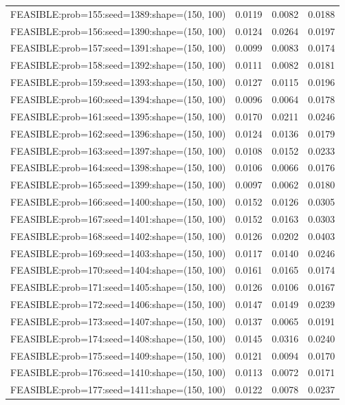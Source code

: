 \begin{longtable}{lccc}
FEASIBLE:prob=155:seed=1389:shape=(150, 100) &   0.0119 & 0.0082 & 0.0188 \\
FEASIBLE:prob=156:seed=1390:shape=(150, 100) &   0.0124 & 0.0264 & 0.0197 \\
FEASIBLE:prob=157:seed=1391:shape=(150, 100) &   0.0099 & 0.0083 & 0.0174 \\
FEASIBLE:prob=158:seed=1392:shape=(150, 100) &   0.0111 & 0.0082 & 0.0181 \\
FEASIBLE:prob=159:seed=1393:shape=(150, 100) &   0.0127 & 0.0115 & 0.0196 \\
FEASIBLE:prob=160:seed=1394:shape=(150, 100) &   0.0096 & 0.0064 & 0.0178 \\
FEASIBLE:prob=161:seed=1395:shape=(150, 100) &   0.0170 & 0.0211 & 0.0246 \\
FEASIBLE:prob=162:seed=1396:shape=(150, 100) &   0.0124 & 0.0136 & 0.0179 \\
FEASIBLE:prob=163:seed=1397:shape=(150, 100) &   0.0108 & 0.0152 & 0.0233 \\
FEASIBLE:prob=164:seed=1398:shape=(150, 100) &   0.0106 & 0.0066 & 0.0176 \\
FEASIBLE:prob=165:seed=1399:shape=(150, 100) &   0.0097 & 0.0062 & 0.0180 \\
FEASIBLE:prob=166:seed=1400:shape=(150, 100) &   0.0152 & 0.0126 & 0.0305 \\
FEASIBLE:prob=167:seed=1401:shape=(150, 100) &   0.0152 & 0.0163 & 0.0303 \\
FEASIBLE:prob=168:seed=1402:shape=(150, 100) &   0.0126 & 0.0202 & 0.0403 \\
FEASIBLE:prob=169:seed=1403:shape=(150, 100) &   0.0117 & 0.0140 & 0.0246 \\
FEASIBLE:prob=170:seed=1404:shape=(150, 100) &   0.0161 & 0.0165 & 0.0174 \\
FEASIBLE:prob=171:seed=1405:shape=(150, 100) &   0.0126 & 0.0106 & 0.0167 \\
FEASIBLE:prob=172:seed=1406:shape=(150, 100) &   0.0147 & 0.0149 & 0.0239 \\
FEASIBLE:prob=173:seed=1407:shape=(150, 100) &   0.0137 & 0.0065 & 0.0191 \\
FEASIBLE:prob=174:seed=1408:shape=(150, 100) &   0.0145 & 0.0316 & 0.0240 \\
FEASIBLE:prob=175:seed=1409:shape=(150, 100) &   0.0121 & 0.0094 & 0.0170 \\
FEASIBLE:prob=176:seed=1410:shape=(150, 100) &   0.0113 & 0.0072 & 0.0171 \\
FEASIBLE:prob=177:seed=1411:shape=(150, 100) &   0.0122 & 0.0078 & 0.0237 \\

\end{longtable}
